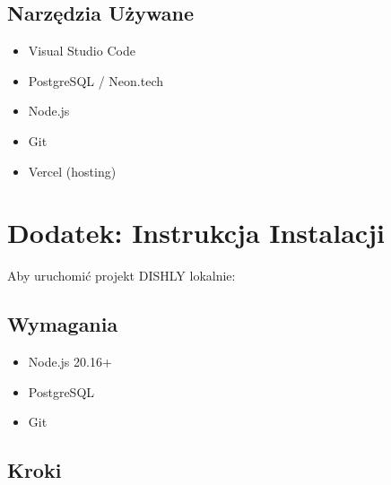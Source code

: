 \documentclass[12pt,a4paper,utf-8]{article}
\begin{document}
\subsection{Narzędzia Używane}

\begin{itemize}
    \item Visual Studio Code
    \item PostgreSQL / Neon.tech
    \item Node.js
    \item Git
    \item Vercel (hosting)
\end{itemize}

\newpage

\section{Dodatek: Instrukcja Instalacji}

Aby uruchomić projekt DISHLY lokalnie:

\subsection{Wymagania}

\begin{itemize}
    \item Node.js 20.16+
    \item PostgreSQL
    \item Git
\end{itemize}

\subsection{Kroki}
\end{document}
